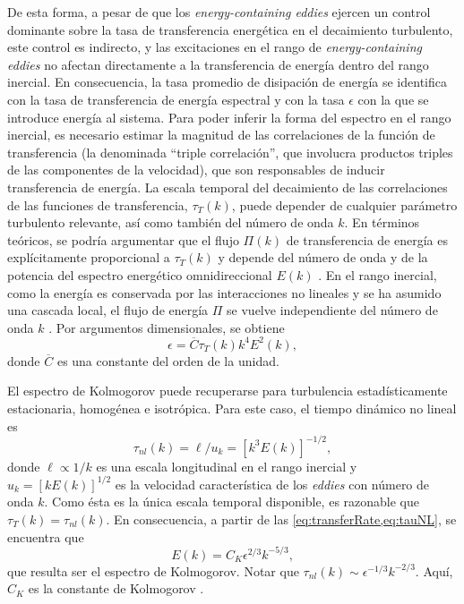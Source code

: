 De esta forma, a pesar de que los \textit{energy-containing eddies} ejercen un
control dominante sobre la tasa de transferencia energética en el
decaimiento turbulento, este control es indirecto, y las excitaciones
en el rango de \textit{energy-containing eddies} no afectan
directamente a la transferencia de energía dentro del rango
inercial. En consecuencia, la tasa promedio de disipación de energía
se identifica con la tasa de transferencia de energía espectral y con
la tasa $\epsilon$ con la que se introduce energía al sistema. Para
poder inferir la forma del espectro en el rango inercial, es necesario
estimar la magnitud de las correlaciones de la función de
transferencia (la denominada ``triple correlación'', que involucra
productos triples de las componentes de la velocidad), que son
responsables de inducir transferencia de energía. La escala temporal
del decaimiento de las correlaciones de las funciones de
transferencia, $\tau_T(k)$, puede depender de cualquier parámetro
turbulento relevante, así como también del número de onda $k$. En
términos teóricos, se podría argumentar que el flujo $\Pi(k)$ de
transferencia de energía es explícitamente proporcional a $\tau_T(k)$
y depende del número de onda y de la potencia del espectro energético
omnidireccional $E(k)$ \cite{batchelor_theory_1953,
  monin_statistical_2013}. En el rango inercial, como la energía es
conservada por las interacciones no lineales y se ha asumido una
cascada local, el flujo de energía $\Pi$ se vuelve independiente del
número de onda $k$ \cite{zhou_degrees_1993,
  zhou_interacting_1993}. Por argumentos dimensionales, se obtiene
\begin{equation}\label{eq:transferRate}
  \epsilon = \overline{C} \tau_T(k) k^4 E^2(k),
\end{equation}
donde $\overline{C}$ es una constante del orden de la unidad.

El espectro de Kolmogorov puede recuperarse para turbulencia
estadísticamente estacionaria, homogénea e isotrópica. Para este caso,
el tiempo dinámico no lineal es
\begin{equation}\label{eq:tauNL}
  \tau_{nl}(k) = \ell/u_k = [k^3 E(k)]^{-1/2},
\end{equation}
donde $\ell\propto 1/k$ es una escala longitudinal en el rango
inercial y $u_k = [k E(k)]^{1/2}$ es la velocidad característica de
los \textit{eddies} con número de onda $k$. Como ésta es la única
escala temporal disponible, es razonable que $\tau_T(k) =
\tau_{nl}(k)$. En consecuencia, a partir de las
\cref{eq:transferRate,eq:tauNL}, se encuentra que
\begin{equation}\label{eq:Ek}
  E(k) = C_K \epsilon^{2/3} k^{-5/3},
\end{equation}
que resulta ser el espectro de Kolmogorov. Notar que $\tau_{nl}(k)
\sim \epsilon^{-1/3} k^{-2/3}$. Aquí, $C_K$ es la constante de
Kolmogorov \cite{sreenivasan_universality_1995,
  yeung_universality_1997}.

